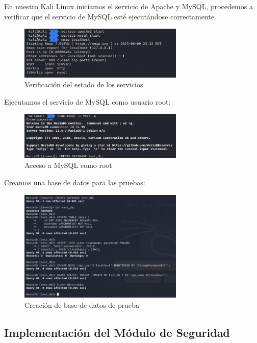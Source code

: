\documentclass[12pt,a4paper]{article}
\begin{document}
En nuestro Kali Linux iniciamos el servicio de Apache y MySQL, procedemos a
verificar que el servicio de MySQL esté ejecutándose correctamente.

\begin{figure}[H]
	\centering
	\includegraphics[width=0.7\textwidth]{./assets/img1.png}
	\caption{Verificación del estado de los servicios}
	\label{fig:servicios-estado}
\end{figure}

Ejecutamos el servicio de MySQL como usuario root:

\begin{figure}[H]
	\centering
	\includegraphics[width=0.7\textwidth]{./assets/img2.png}
	\caption{Acceso a MySQL como root}
	\label{fig:mysql-root}
\end{figure}

Creamos una base de datos para las pruebas:

\begin{figure}[H]
	\centering
	\includegraphics[width=0.7\textwidth]{./assets/img3.png}
	\caption{Creación de base de datos de prueba}
	\label{fig:db-creacion}
\end{figure}

\subsection{Implementación del Módulo de Seguridad}
\end{document}
